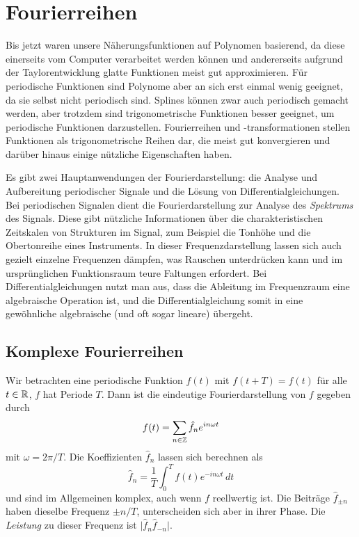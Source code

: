 \section{Fourierreihen}

Bis jetzt waren unsere Näherungsfunktionen auf Polynomen basierend, da
diese einerseits vom Computer verarbeitet werden können und
andererseits aufgrund der Taylorentwicklung glatte Funktionen meist
gut approximieren. Für periodische Funktionen sind Polynome aber an
sich erst einmal wenig geeignet, da sie selbst nicht periodisch
sind. Splines können zwar auch periodisch gemacht werden, aber
trotzdem sind trigonometrische Funktionen besser geeignet, um
periodische Funktionen darzustellen. Fourierreihen und
-transformationen stellen Funktionen als trigonometrische Reihen dar,
die meist gut konvergieren und darüber hinaus einige nützliche
Eigenschaften haben.

Es gibt zwei Hauptanwendungen der Fourierdarstellung: die Analyse und
Aufbereitung periodischer Signale und die Lösung von
Differentialgleichungen.  Bei periodischen Signalen dient die
Fourierdarstellung zur Analyse des \emph{Spektrums} des Signals.
Diese gibt nützliche Informationen über die charakteristischen
Zeitskalen von Strukturen im Signal, zum Beispiel die Tonhöhe und die
Obertonreihe eines Instruments. In dieser Frequenzdarstellung lassen
sich auch gezielt einzelne Frequenzen dämpfen, was Rauschen
unterdrücken kann und im ursprünglichen Funktionsraum teure Faltungen
erfordert.  Bei Differentialgleichungen nutzt man aus, dass die
Ableitung im Frequenzraum eine algebraische Operation ist, und die
Differentialgleichung somit in eine gewöhnliche algebraische (und oft
sogar lineare) übergeht.

\subsection{Komplexe Fourierreihen}
Wir betrachten eine periodische Funktion $f(t)$ mit $f(t+T) = f(t)$
für alle $t\in\mathbb{R}$, \dh $f$ hat Periode $T$. Dann ist die
eindeutige Fourierdarstellung von $f$ gegeben durch
\begin{equation}
  \label{eq:fourier}
  f(t) = \sum_{n\in\mathbb{Z}} \hat{f}_n e^{i n\omega t}
\end{equation}
mit $\omega=2\pi/T$. Die Koeffizienten $\hat{f}_n$ lassen sich
berechnen als
\begin{equation*}
  \label{eq:fouriercoeff}
  \hat{f}_n = \frac{1}{T}\int_0^T f(t)e^{-i n\omega t}\, dt
\end{equation*}
und sind im Allgemeinen komplex, auch wenn $f$ reellwertig ist. Die
Beiträge $\hat{f}_{\pm n}$ haben dieselbe Frequenz $\pm n/T$,
unterscheiden sich aber in ihrer Phase. Die \emph{Leistung} zu dieser
Frequenz ist $\lvert\hat{f}_{n}\hat{f}_{-n}\rvert$.

